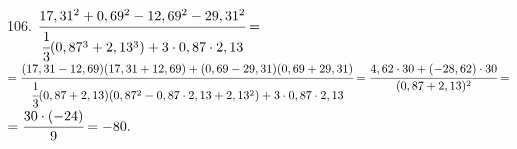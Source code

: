 106. $\cfrac{17,31^2+0,69^2-12,69^2-29,31^2}{\cfrac{1}{3}(0,87^3+2,13^3)+3\cdot0,87\cdot2,13}=$\\$=\cfrac{(17,31-12,69)(17,31+12,69)+(0,69-29,31)(0,69+29,31)}{\cfrac{1}{3}(0,87+2,13)(0,87^2-0,87\cdot2,13+2,13^2)+3\cdot0,87\cdot2,13}=
\cfrac{4,62\cdot30+(-28,62)\cdot30}{(0,87+2,13)^2}=$\\$=\cfrac{30\cdot(-24)}{9}=-80.$\\
